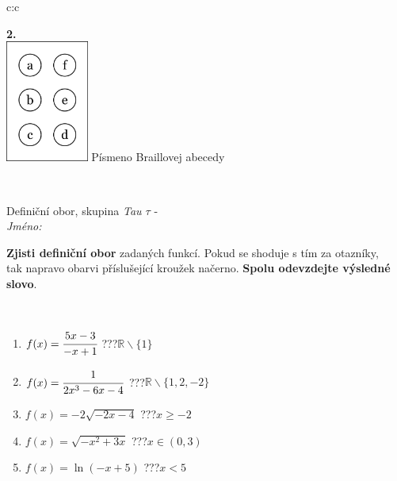 \documentclass[10pt]{report}
\begin{document}
\begin{tabular}{c:c}
\begin{minipage}[c][104.5mm][t]{0.5\linewidth}
\begin{center}
\begin{minipage}{0.20\linewidth}
\begin{center}
{\Huge\bfseries 2.} \\[2mm]
\includegraphics[height=40mm]{../images/braille.png}
{\small Písmeno Braillovej abecedy}
\end{center}
\end{minipage}
\end{center}
\end{minipage}
\\ \hdashline
\begin{minipage}[c][104.5mm][t]{0.5\linewidth}
\begin{center}
\vspace{7mm}
{\huge Definiční obor, skupina \textit{Tau $\tau$} -}\\[5mm]
\textit{Jméno:}\phantom{xxxxxxxxxxxxxxxxxxxxxxxxxxxxxxxxxxxxxxxxxxxxxxxxxxxxxxxxxxxxxxxxx}\\[5mm]
\begin{minipage}{0.95\linewidth}
\begin{center}
\textbf{Zjisti definiční obor} zadaných funkcí. Pokud se shoduje s tím za otazníky,\\tak napravo obarvi příslušející kroužek načerno. \textbf{Spolu odevzdejte výsledné slovo}.
\end{center}
\end{minipage}
\\[1mm]
\begin{minipage}{0.79\linewidth}
\begin{center}
\begin{varwidth}{\linewidth}
\begin{enumerate}
\normalsizerrr
\item $f(x)=\cfrac{5x-3}{-x+1}$\quad \dotfill\; ???\;\dotfill \quad $\mathbb{R}\smallsetminus\{1\}$
\item $f(x)=\cfrac{1}{2x^3-6x-4}$\quad \dotfill\; ???\;\dotfill \quad $\mathbb{R}\smallsetminus\{1,2,-2\}$
\item $f(x)=-2\sqrt{-2x-4}$\quad \dotfill\; ???\;\dotfill \quad $x\geq-2$
\item $f(x)=\sqrt{-x^2+3x}$\quad \dotfill\; ???\;\dotfill \quad $x\in(0 , 3)$
\item $f(x)=\ln{(-x+5)}$\quad \dotfill\; ???\;\dotfill \quad $x<5$

\end{enumerate}
\end{varwidth}
\end{center}
\end{minipage}
\end{center}
\end{minipage}
\end{tabular}
\end{document}
